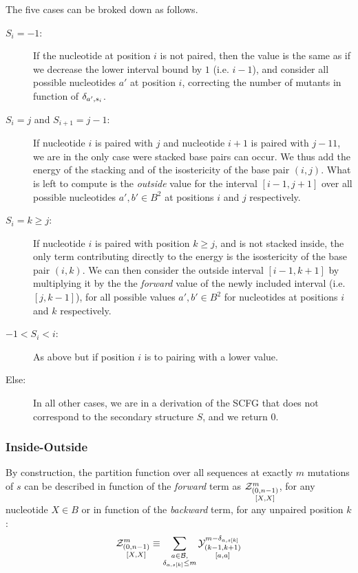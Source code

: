 The five cases can be broked down as follows.
\begin{description}
\item[$S_i=-1$:] If the nucleotide at position $i$ is not paired, then the value is the same
as if we decrease the lower interval bound by $1$ (i.e. $i-1$), and consider all possible
nucleotides $a'$ at position $i$, correcting the number of mutants
in function of $\delta_{a',s_i}$.
\item[$S_{i}=j$ and $S_{i+1}=j-1$:] If nucleotide $i$ is paired with $j$ and nucleotide $i+1$ is
paired with $j-11$, we are in the only case were stacked base pairs can occur. We thus add
the energy of the stacking and of the isostericity of the base pair $(i,j)$. What is left
to compute is the \emph{outside} value for the interval $[i-1,j+1]$ over all possible nucleotides 
$a',b'\in B^2$ at positions $i$ and $j$ respectively.
\item[$S_{i}=k \geq j$:]If nucleotide $i$ is paired with position $k\geq j$, 
and is not stacked inside, the 
only term contributing directly to the energy is the isostericity of the base pair $(i,k)$. 
We can then consider the outside interval $[i-1,k+1]$ by multiplying it by the the \emph{forward}
value of the newly included interval (i.e. $[j,k-1]$), for 
all possible values $a',b'\in B^2$ for nucleotides at positions $i$ and $k$ respectively.
\item[$-1<S_{i}<i$:]As above but if position $i$ is to pairing with a lower value.
\item[Else:] In all other cases, we are in a derivation of the SCFG that does not correspond to the 
secondary structure $S$, and we return $0$.


\end{description}

\subsubsection{Inside-Outside}
By construction, the partition function over all sequences at exactly $m$ mutations of $s$ can 
be described in function of the \emph{forward} term as $\Z{0,n-1}{m}{X,X}$,
 for any nucleotide $X\in B$ or
in function of the \emph{backward} term, for any unpaired position $k$:
$$
	\Z{0,n-1}{m}{X,X}
	\equiv
	\sum_{\substack{a\in \B,\\ \Kron_{a,s[k]}\le m}}	
	\Y{k-1,k+1}{m-\Kron_{a,s[k]}}{a,a}
$$

